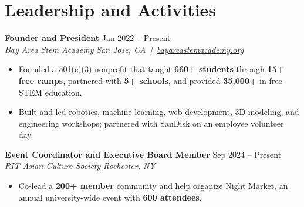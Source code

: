 \documentclass[10pt,letterpaper]{article}
\newif\ifresumeFirstRole
\newcommand{\resumeRole}[4]{%
  \ifresumeFirstRole
    \global\resumeFirstRolefalse
  \else
    \vspace{0pt plus 1fill}%
  \fi
  \textbf{#1} \hfill #2\\
  \textit{#3} \hfill \textit{#4}
}
\begin{document}
\section*{Leadership and Activities}
\resumeRole{Founder and President}{Jan 2022 -- Present}{Bay Area Stem Academy}{San Jose, CA \,|\, \href{https://bayareastemacademy.org}{bayareastemacademy.org}}
\begin{itemize}
  \item Founded a 501(c)(3) nonprofit that taught \textbf{660+ students} through \textbf{15+ free camps}, partnered with \textbf{5+ schools}, and provided \textbf{\textdollar{}35,000+} in free STEM education.
  \item Built and led robotics, machine learning, web development, 3D modeling, and engineering workshops; partnered with SanDisk on an employee volunteer day.
\end{itemize}

\resumeRole{Event Coordinator and Executive Board Member}{Sep 2024 -- Present}{RIT Asian Culture Society}{Rochester, NY}
\begin{itemize}
  \item Co-lead a \textbf{200+ member} community and help organize Night Market, an annual university-wide event with \textbf{600 attendees}.
\end{itemize}
\end{document}
